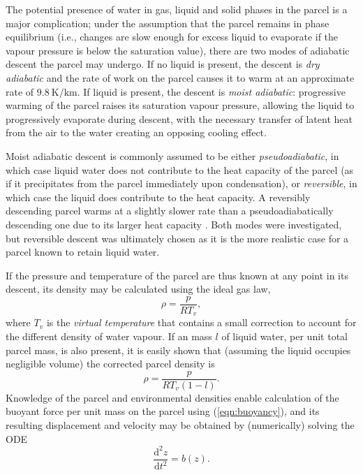 \documentclass[12pt,titlepage]{article}
\begin{document}
The potential presence of water in gas, liquid and solid phases in the
parcel is a major complication; under the assumption that the parcel
remains in phase equilibrium (i.e., changes are slow enough for
excess liquid to evaporate if the vapour pressure is below the
saturation value), there are two modes of adiabatic descent the parcel
may undergo. If no liquid is present, the descent is \emph{dry
adiabatic} and the rate of work on the parcel causes it to warm at
an approximate rate of $\SI{9.8}{\kelvin \per\kilo\meter}$.
If liquid is present, the descent is \emph{moist adiabatic}:
progressive warming of the parcel raises its saturation vapour pressure,
allowing the liquid to progressively evaporate during descent,
with the necessary transfer of latent heat from the air to the water
creating an opposing cooling effect.

Moist adiabatic descent is commonly assumed to be either
\emph{pseudoadiabatic}, in which case liquid water does not contribute
to the heat capacity of the parcel (as if it precipitates from the
parcel immediately upon condensation), or \emph{reversible}, in
which case the liquid does contribute to the heat capacity.
A reversibly descending parcel warms at a slightly slower rate than a
pseudoadiabatically descending one due to its larger heat capacity
\textcite{saunders_1957}.
Both modes were investigated, but reversible descent was ultimately
chosen as it is the more realistic case for a parcel known to retain
liquid water.

If the pressure and temperature of the parcel are thus known at any
point in its descent, its density may be calculated using the ideal
gas law,
\begin{equation}
	\rho = \frac{p}{RT_v}, \label{eqn:density}
\end{equation}
where $T_v$ is the \emph{virtual temperature} that contains a small
correction to account for the different density of water vapour.
If an mass $l$ of liquid water, per unit total parcel mass, is also
present, it is easily shown that (assuming the liquid occupies
negligible volume) the corrected parcel density is
\begin{equation}
	\rho = \frac{p}{RT_v (1 - l)}.
\end{equation}
Knowledge of the parcel and environmental densities enable calculation
of the buoyant force per unit mass on the parcel using
(\ref{eqn:buoyancy}), and its resulting displacement and velocity may be
obtained by (numerically) solving the ODE
\begin{equation}
	\frac{\mathrm{d}^2 z}{\mathrm{d}t^2} = b(z).
	\label{eqn:ode}
\end{equation}
\end{document}
